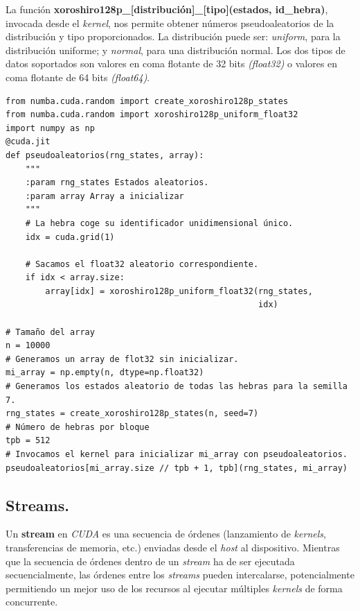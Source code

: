 La función \textbf{xoroshiro128p\_[distribución]\_[tipo](estados, id\_hebra)}, invocada desde el \textit{kernel}, nos permite obtener números pseudoaleatorios de la distribución y tipo proporcionados. La distribución puede ser: \textit{uniform}, para la distribución uniforme; y \textit{normal}, para una distribución normal. Los dos tipos de datos soportados son valores en coma flotante de 32 bits \textit{(float32)} o valores en coma flotante de 64 bits \textit{(float64)}. \\

\begin{code}
\begin{verbatim}
from numba.cuda.random import create_xoroshiro128p_states
from numba.cuda.random import xoroshiro128p_uniform_float32
import numpy as np
@cuda.jit
def pseudoaleatorios(rng_states, array):
    """
    :param rng_states Estados aleatorios.
    :param array Array a inicializar
    """
    # La hebra coge su identificador unidimensional único.
    idx = cuda.grid(1)

    # Sacamos el float32 aleatorio correspondiente.
    if idx < array.size:
        array[idx] = xoroshiro128p_uniform_float32(rng_states,
                                                   idx)

# Tamaño del array
n = 10000
# Generamos un array de flot32 sin inicializar.
mi_array = np.empty(n, dtype=np.float32)
# Generamos los estados aleatorio de todas las hebras para la semilla 7.
rng_states = create_xoroshiro128p_states(n, seed=7)
# Número de hebras por bloque
tpb = 512
# Invocamos el kernel para inicializar mi_array con pseudoaleatorios.
pseudoaleatorios[mi_array.size // tpb + 1, tpb](rng_states, mi_array)
\end{verbatim}
\label{code:randoms}
\end{code}

\subsection{Streams.}
Un \textbf{stream} en \textit{CUDA} es una secuencia de órdenes (lanzamiento de \textit{kernels}, transferencias de memoria, etc.) enviadas desde el \textit{host} al dispositivo. Mientras que la secuencia de órdenes dentro de un \textit{stream} ha de ser ejecutada secuencialmente, las órdenes entre los \textit{streams} pueden intercalarse, potencialmente permitiendo un mejor uso de los recursos al ejecutar múltiples \textit{kernels} de forma concurrente. \\

